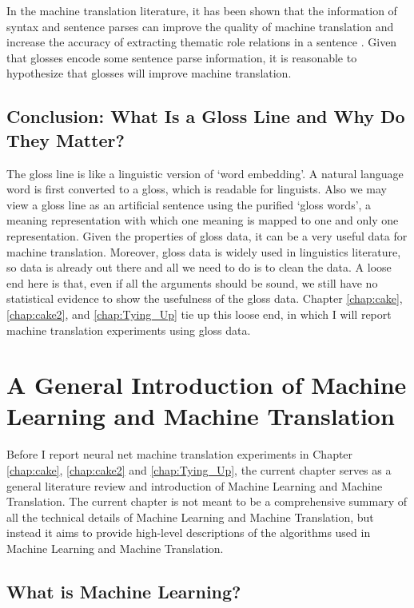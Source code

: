 \documentclass[final]{ua-thesis}
\numberwithin{equation}{section}
\begin{document}
In the machine translation literature, it has been shown that the information of syntax and sentence parses can improve the quality of machine translation \citep{Syntax_to_Translation} and increase the accuracy of extracting thematic role relations in a sentence \citep{Semantic_Role_Labeling}. Given that glosses encode some sentence parse information, it is reasonable to hypothesize that glosses will improve machine translation.      

\section{Conclusion: What Is a Gloss Line and Why Do They Matter?} 
The gloss line is like a linguistic version of `word embedding'. A natural language word is first converted to a gloss, which is readable for linguists. 
Also we may view a gloss line as an artificial sentence using the purified `gloss words', a meaning representation with which one meaning is mapped to one and only one representation. Given the properties of gloss data, it can be a very useful data for machine translation. Moreover, gloss data is widely used in linguistics literature, so data is already out there and all we need to do is to clean the data.
A loose end here is that, even if all the arguments should be sound, we still have no statistical evidence to show the usefulness of the gloss data. Chapter \ref{chap:cake}, \ref{chap:cake2}, and \ref{chap:Tying_Up} tie up this loose end, in which I will report machine translation experiments using gloss data.  
\chapter{A General Introduction of Machine Learning and Machine Translation}
\label{chap:MT}


Before I report neural net machine translation experiments in Chapter \ref{chap:cake}, \ref{chap:cake2} and \ref{chap:Tying_Up}, the current chapter serves as a general literature review and introduction of Machine Learning and Machine Translation. The current chapter is not meant to be a comprehensive summary of all the technical details of Machine Learning and Machine Translation, but instead it aims to provide high-level descriptions of the algorithms used in Machine Learning and Machine Translation. 

\section{What is Machine Learning?}
\end{document}
